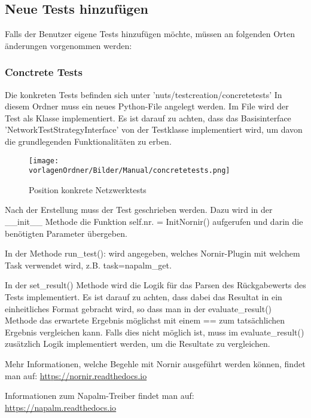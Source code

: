 \documentclass[]{subfiles}
\begin{document}
		\newpage

\subsection{Neue Tests hinzufügen}
	Falls der Benutzer eigene Tests hinzufügen möchte,
	 müssen an folgenden Orten änderungen vorgenommen werden:

	\subsubsection{Conctrete Tests}
		Die konkreten Tests befinden sich unter 'nuts/testcreation/concretetests'
		In diesem Ordner muss ein neues Python-File angelegt werden.
		Im File wird der Test als Klasse implementiert.
		Es ist darauf zu achten, dass das Basisinterface 'NetworkTestStrategyInterface' 
		von der Testklasse implementiert wird, um davon die grundlegenden Funktionalitäten
		zu erben.

		\begin{figure}[h!]
			\begin{center}
				\texttt{[image: \\vorlagenOrdner/Bilder/Manual/concretetests.png]}
				\caption{Position konkrete Netzwerktests}
			\end{center}
		\end{figure}

		Nach der Erstellung muss der Test geschrieben werden.
		Dazu wird in der \_\_init\_\_ Methode die Funktion self.nr. = InitNornir() aufgerufen
		und darin die benötigten Parameter übergeben.

		In der Methode run\_test(): wird angegeben, welches Nornir-Plugin mit welchem Task
		verwendet wird, z.B. task=napalm\_get.
		
		In der set\_result() Methode wird die Logik für das Parsen des Rückgabewerts des Tests
		implementiert. 
		Es ist darauf zu achten, dass dabei das Resultat in ein einheitliches Format gebracht 
		wird, so dass man in der evaluate\_result() Methode das erwartete Ergebnis möglichst 
		mit einem == zum tatsächlichen Ergebnis vergleichen kann.
		Falls dies nicht möglich ist, muss im evaluate\_result() zusätzlich Logik implementiert
		werden, um die Resultate zu vergleichen.

		Mehr Informationen, welche Begehle mit Nornir ausgeführt werden können, findet man 
		auf: \newline \url{https://nornir.readthedocs.io}

		Informationen zum Napalm-Treiber findet man auf: \url{https://napalm.readthedocs.io}
\end{document}
